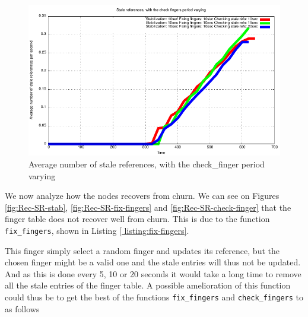 \documentclass[a4paper, 11pt]{article}
\theoremstyle{plain}
\theoremstyle{definition}
\begin{document}
    
    \begin{figure}[h]
      \centering
      \includegraphics{plots/Average-SR-check-finger.pdf}
      \caption{Average number of stale references, with the check\_finger period varying}
      \label{fig:Av-SR-check-finger}
    \end{figure}

    

    We now analyze how the nodes recovers from churn. We can see on Figures \ref{fig:Rec-SR-stab},
    \ref{fig:Rec-SR-fix-fingers} and \ref{fig:Rec-SR-check-finger} that the finger table does not recover well
    from churn. This is due to the function \texttt{fix\_fingers}, shown in Listing \ref{
    listing:fix-fingers}. 

    

    This finger simply select a random finger and updates its reference, but the chosen finger might be a
    valid one and the stale entries will thus not be updated. And as this is done every 5, 10 or 20 seconds it
    would take a long time to remove all the stale entries of the finger table. A possible amelioration of
    this function could thus be to get the best of the functions \texttt{fix\_fingers} and \texttt{check\_fingers} to as follows
    
    
\end{document}
